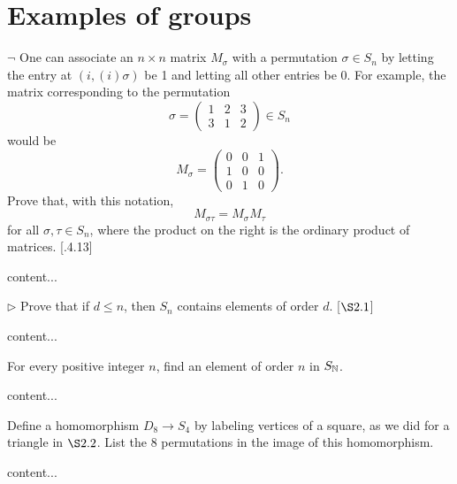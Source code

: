 \section{Examples of groups}
\extitle

\begin{exercise}
	$\neg$ One can associate an $n\times n$ matrix $M_{\sigma}$ with a permutation $\sigma\in S_n$ by letting the entry at $(i,(i)\sigma)$ be 1 and letting all other entries be 0. For example, the matrix corresponding to the permutation
	\[
		\sigma = 
		\begin{pmatrix}
			1 & 2 & 3 \\
			3 & 1 & 2
		\end{pmatrix}
		\in S_n
	\]
	 would be 
	 \[
	 	M_\sigma = 
	 	\begin{pmatrix}
	 		0 & 0 & 1\\
	 		1 & 0 & 0\\
	 		0 & 1 & 0 
	 	\end{pmatrix}.
	 \]
	 Prove that, with this notation, 
	 \[M_{\sigma\tau} = M_\sigma M_\tau\]
	 for all $\sigma, \tau\in S_n$, where the product on the right is the ordinary product of matrices. [.4.13]
\end{exercise}
\begin{solution}
	content...
\end{solution}

\begin{exercise}
	$\triangleright$ Prove that if $d\leq n$, then $S_n$ contains elements of order $d$. [$\S 2.1$]
\end{exercise}
\begin{solution}
	content...
\end{solution}

\begin{exercise}
	For every positive integer $n$, find an element of order $n$ in $S_{\mathbb{N}}$.
\end{exercise}
\begin{solution}
	content...
\end{solution}

\begin{exercise}
	Define a homomorphism $D_8 \to S_4$ by labeling vertices of a square, as we did for a triangle in $\S 2.2$. List the 8 permutations in the image of this homomorphism.
\end{exercise}
\begin{solution}
	content...
\end{solution}

